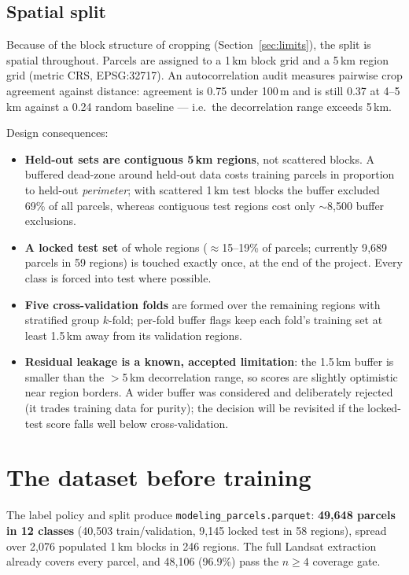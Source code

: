 \documentclass[11pt,a4paper]{article}
\begin{document}
\subsection{Spatial split}
\label{sec:split}

Because of the block structure of cropping (Section~\ref{sec:limits}), the split is spatial
throughout. Parcels are assigned to a 1\,km block grid and a 5\,km region grid (metric CRS,
EPSG:32717). An autocorrelation audit measures pairwise crop agreement against distance:
agreement is 0.75 under 100\,m and is still 0.37 at 4--5\,km against a 0.24 random baseline ---
i.e.\ the decorrelation range exceeds 5\,km.

Design consequences:
\begin{itemize}[leftmargin=1.5em]
\item \textbf{Held-out sets are contiguous 5\,km regions}, not scattered blocks. A buffered
dead-zone around held-out data costs training parcels in proportion to held-out
\emph{perimeter}; with scattered 1\,km test blocks the buffer excluded 69\% of all parcels,
whereas contiguous test regions cost only $\sim$8{,}500 buffer exclusions.
\item \textbf{A locked test set} of whole regions ($\approx$15--19\% of parcels; currently
9{,}689 parcels in 59 regions) is touched exactly once, at the end of the project. Every class
is forced into test where possible.
\item \textbf{Five cross-validation folds} are formed over the remaining regions with
stratified group $k$-fold; per-fold buffer flags keep each fold's training set at least
1.5\,km away from its validation regions.
\item \textbf{Residual leakage is a known, accepted limitation}: the 1.5\,km buffer is smaller
than the $>$5\,km decorrelation range, so scores are slightly optimistic near region borders.
A wider buffer was considered and deliberately rejected (it trades training data for purity);
the decision will be revisited if the locked-test score falls well below cross-validation.
\end{itemize}

\section{The dataset before training}
\label{sec:final}

The label policy and split produce \texttt{modeling\_parcels.parquet}: \textbf{49{,}648 parcels
in 12 classes} (40{,}503 train/validation, 9{,}145 locked test in 58 regions), spread over
2{,}076 populated 1\,km blocks in 246 regions. The full Landsat extraction already covers every
parcel, and 48{,}106 (96.9\%) pass the $n\geq4$ coverage gate.
\end{document}
